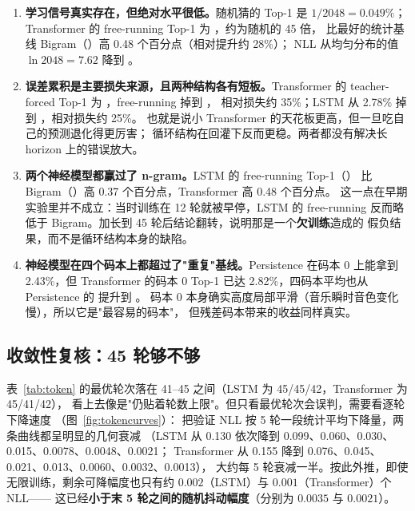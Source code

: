 \begin{enumerate}
  \item \textbf{学习信号真实存在，但绝对水平很低。}随机猜的 Top-1 是 $1/2048=0.049\%$；
        Transformer 的 free-running Top-1 为 \TokTransformerFree{}，约为随机的 45 倍，
        比最好的统计基线 Bigram（\TokBigramFree{}）高 0.48 个百分点（相对提升约 28\%）；
        NLL 从均匀分布的值 $\ln 2048 = 7.62$ 降到 \TokTransformerNll{}。
  \item \textbf{误差累积是主要损失来源，且两种结构各有短板。}Transformer 的
        teacher-forced Top-1 为 \TokTfTeacher{}，free-running 掉到 \TokTransformerFree{}，
        相对损失约 35\%；LSTM 从 2.78\% 掉到 \TokLstmFree{}，相对损失约 25\%。
        也就是说小 Transformer 的天花板更高，但一旦吃自己的预测退化得更厉害；
        循环结构在回灌下反而更稳。两者都没有解决长 horizon 上的错误放大。
  \item \textbf{两个神经模型都赢过了 n-gram。}LSTM 的 free-running Top-1（\TokLstmFree{}）
        比 Bigram（\TokBigramFree{}）高 0.37 个百分点，Transformer 高 0.48 个百分点。
        这一点在早期实验里并不成立：当时训练在 12 轮就被早停，LSTM 的 free-running
        反而略低于 Bigram。加长到 45 轮后结论翻转，说明那是一个\textbf{欠训练}造成的
        假负结果，而不是循环结构本身的缺陷。
  \item \textbf{神经模型在四个码本上都超过了"重复"基线。}Persistence 在码本 0 上能拿到
        2.43\%，但 Transformer 的码本 0 Top-1 已达 2.82\%，四码本平均也从
        Persistence 的 \TokPersistenceFree{} 提升到 \TokTransformerFree{}。
        码本 0 本身确实高度局部平滑（音乐瞬时音色变化慢），所以它是"最容易的码本"，
        但残差码本带来的收益同样真实。
\end{enumerate}

\subsection{收敛性复核：45 轮够不够}\label{sec:p2conv}

表~\ref{tab:token} 的最优轮次落在 41--45 之间（LSTM 为 45/45/42，Transformer 为 45/41/42），
看上去像是"仍贴着轮数上限"。但只看最优轮次会误判，需要看逐轮下降速度
（图~\ref{fig:tokencurves}）：
把验证 NLL 按 5 轮一段统计平均下降量，两条曲线都呈明显的几何衰减
（LSTM 从 0.130 依次降到 0.099、0.060、0.030、0.015、0.0078、0.0048、0.0021；
Transformer 从 0.155 降到 0.076、0.045、0.021、0.013、0.0060、0.0032、0.0013），
大约每 5 轮衰减一半。按此外推，即使无限训练，剩余可降幅度也只有约
$0.002$（LSTM）与 $0.001$（Transformer）个 NLL——
这已经\textbf{小于末 5 轮之间的随机抖动幅度}（分别为 $0.0035$ 与 $0.0021$）。

